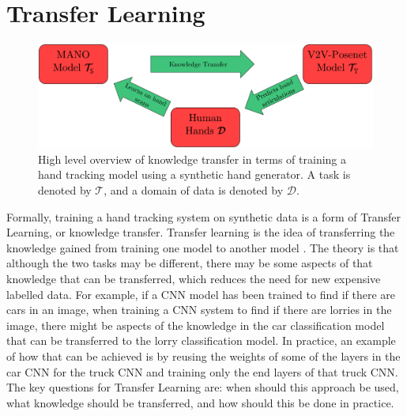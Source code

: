 \section{Transfer Learning}
\begin{figure}
\includegraphics[width=\linewidth]{figs/general/knowledge_transfer.pdf}
\caption{High level overview of knowledge transfer in terms of training a hand tracking model using a synthetic hand generator. A task is denoted by $\mathcal{T}$, and a domain of data is denoted by $\mathcal{D}$.}
\label{fig:ktex}
\end{figure}
Formally, training a hand tracking system on synthetic data is a form of Transfer Learning, or knowledge transfer. Transfer learning is the idea of transferring the knowledge gained from training one model to another model \cite{pan2009survey}. The theory is that although the two tasks may be different, there may be some aspects of that knowledge that can be transferred, which reduces the need for new expensive labelled data. For example, if a CNN model has been trained to find if there are cars in an image, when training a CNN system to find if there are lorries in the image, there might be aspects of the knowledge in the car classification model that can be transferred to the lorry classification model. In practice, an example of how that can be achieved is by reusing the weights of some of the layers in the car CNN for the truck CNN and training only the end layers of that truck CNN. The key questions for Transfer Learning are: when should this approach be used, what knowledge should be transferred, and how should this be done in practice.


